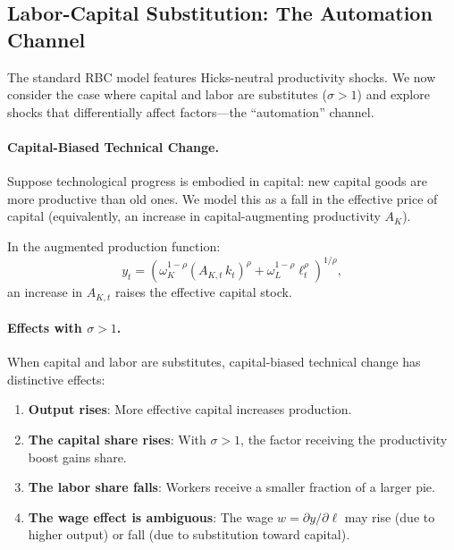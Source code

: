 \subsection{Labor-Capital Substitution: The Automation Channel}
\label{subsec:rbc-automation}

The standard RBC model features Hicks-neutral productivity shocks. We now consider the case where capital and labor are substitutes ($\sigma > 1$) and explore shocks that differentially affect factors---the ``automation'' channel.

\paragraph{Capital-Biased Technical Change.}
Suppose technological progress is embodied in capital: new capital goods are more productive than old ones. We model this as a fall in the effective price of capital (equivalently, an increase in capital-augmenting productivity $A_K$).

In the augmented production function:
\begin{equation}
y_t = \left( \omega_K^{1-\rho} (A_{K,t} \, k_t)^\rho + \omega_L^{1-\rho} \ell_t^\rho \right)^{1/\rho},
\label{eq:capital-biased}
\end{equation}
an increase in $A_{K,t}$ raises the effective capital stock.

\paragraph{Effects with $\sigma > 1$.}
When capital and labor are substitutes, capital-biased technical change has distinctive effects:

\begin{enumerate}[nosep]
\item \textbf{Output rises}: More effective capital increases production.
\item \textbf{The capital share rises}: With $\sigma > 1$, the factor receiving the productivity boost gains share.
\item \textbf{The labor share falls}: Workers receive a smaller fraction of a larger pie.
\item \textbf{The wage effect is ambiguous}: The wage $w = \partial y / \partial \ell$ may rise (due to higher output) or fall (due to substitution toward capital).
\end{enumerate}

